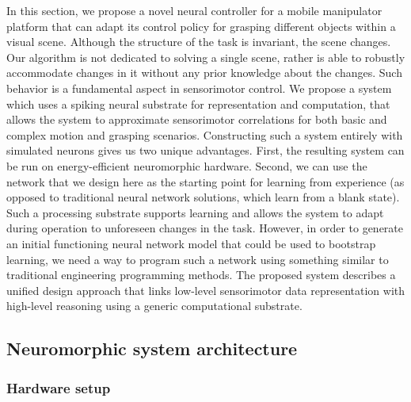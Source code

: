 In this section, we propose a novel neural controller for a mobile manipulator platform that can adapt its control policy for grasping different objects within a visual scene.
Although the structure of the task is invariant, the scene changes. 
Our algorithm is not dedicated to solving a single scene, rather is able to robustly accommodate changes in it without any prior knowledge about the changes. 
Such behavior is a fundamental aspect in sensorimotor control. 
We propose a system which uses a spiking neural substrate for representation and computation, that allows the system to approximate sensorimotor correlations for both basic and complex motion and grasping scenarios. 
Constructing such a system entirely with simulated neurons gives us two unique advantages.
First, the resulting system can be run on energy-efficient neuromorphic hardware.
Second, we can use the network that we design here as the starting point for learning from experience (as opposed to traditional neural network solutions, which learn from a blank state).
Such a processing substrate supports learning and allows the system to adapt during operation to unforeseen changes in the task. 
However, in order to generate an initial functioning neural network model that could be used to bootstrap learning, we need a way to program such a network using something similar to traditional engineering programming methods.
The proposed system describes a unified design approach that links low-level sensorimotor data representation with high-level reasoning using a generic computational substrate.

\subsection{Neuromorphic system architecture}%
\label{subsec:neuromorphic_system_architecture}

\subsubsection{Hardware setup}%
\label{ssubsec:hardware_setup}


